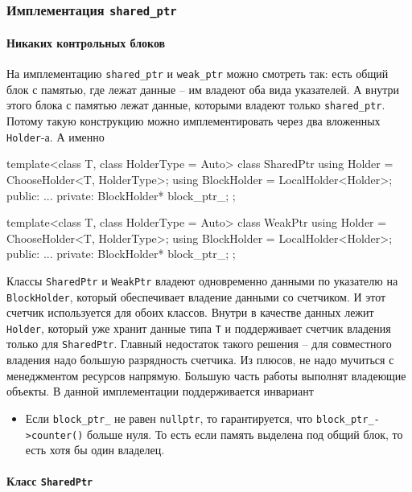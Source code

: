 \subsubsection{Имплементация \texttt{shared\_ptr}}

\paragraph{Никаких контрольных блоков}

На имплементацию \verb"shared_ptr" и \verb"weak_ptr" можно смотреть так: есть общий блок с памятью, где лежат данные -- им владеют оба вида указателей.
А внутри этого блока с памятью лежат данные, которыми владеют только \verb"shared_ptr".
Потому такую конструкцию можно имплементировать через два вложенных \verb"Holder"-а.
А именно
\begin{cppcode}
template<class T, class HolderType = Auto>
class SharedPtr {
  using Holder = ChooseHolder<T, HolderType>;
  using BlockHolder = LocalHolder<Holder>;
public:
  ...
private:
  BlockHolder* block_ptr_;
};

template<class T, class HolderType = Auto>
class WeakPtr {
  using Holder = ChooseHolder<T, HolderType>;
  using BlockHolder = LocalHolder<Holder>;
public:
  ...
private:
  BlockHolder* block_ptr_;
};
\end{cppcode}
Классы \verb"SharedPtr" и \verb"WeakPtr" владеют одновременно данными по указателю на \verb"BlockHolder", который обеспечивает владение данными со счетчиком.
И этот счетчик используется для обоих классов.
Внутри в качестве данных лежит \verb"Holder", который уже хранит данные типа \verb"T" и поддерживает счетчик владения только для \verb"SharedPtr".
Главный недостаток такого решения -- для совместного владения надо большую разрядность счетчика.
Из плюсов, не надо мучиться с менеджментом ресурсов напрямую.
Большую часть работы выполнят владеющие объекты.
В данной имплементации поддерживается инвариант
\begin{itemize}
\item Если \verb"block_ptr_" не равен \verb"nullptr", то гарантируется, что \verb"block_ptr_->counter()" больше нуля.
То есть если память выделена под общий блок, то есть хотя бы один владелец.
\end{itemize}

\paragraph{Класс \texttt{SharedPtr}}

